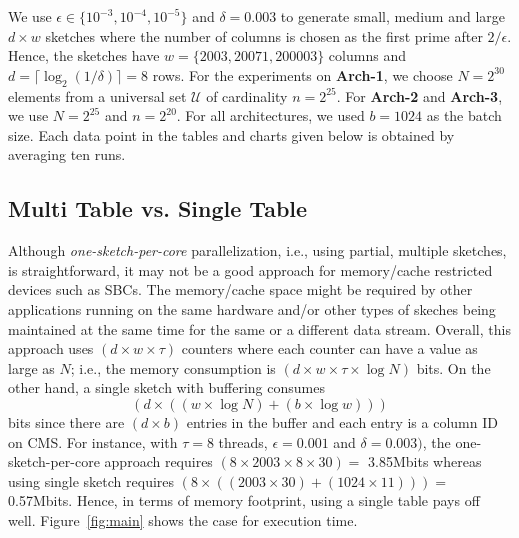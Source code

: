 \documentclass[runningheads]{llncs}
\begin{document}
We use $\epsilon \in \{10^{-3}, 10^{-4}, 10^{-5}\}$ and $\delta = 0.003$ to generate small, medium and large $d \times w$ sketches  where the number of columns is chosen as the first prime after $2/\epsilon$. Hence, the sketches have $w = \{2003, 20071, 200003\}$ columns and $d = \lceil \log_2(1/\delta) \rceil = 8$ rows. For the experiments on {\bf Arch-1}, we choose $N = 2^{30}$ elements from a universal set $\mathcal{U}$ of cardinality $n = 2^{25}$. For {\bf Arch-2} and   {\bf Arch-3}, we use $N = 2^{25}$ and $n = 2^{20}$. For all architectures, we used $b = 1024$ as the batch size. Each data point in the tables and charts given below is obtained by averaging ten runs. 

\subsection{Multi Table vs. Single Table}

Although {\em one-sketch-per-core} parallelization, i.e., using partial, multiple sketches, is straightforward, it may not be a good approach for memory/cache restricted devices such as SBCs. The memory/cache space might be required by other applications running on the same hardware and/or other types of skeches being maintained at the same time for the same or a different data stream. 
Overall, this approach uses $(d \times w \times \tau)$ counters
where each counter can have a value as large as $N$; i.e., the memory consumption is
$(d \times w \times \tau \times \log N)$ bits. On the other hand, a single sketch with buffering
consumes $$(d \times ((w \times \log N) + (b \times \log w)))$$ bits since there are $(d \times b)$ entries in the
buffer and each entry is a column ID on CMS. For instance, with $\tau = 8$ threads, $\epsilon = 0.001$ and $\delta = 0.003)$, the one-sketch-per-core approach requires $(8 \times 2003 \times 8 \times 30) =$ 3.85Mbits whereas using single sketch requires
$(8 \times ((2003 \times 30) + (1024 \times 11))) =$ 0.57Mbits. Hence, in terms of memory footprint, using a single table pays off well. Figure~\ref{fig:main} shows the case for execution time.
\end{document}
